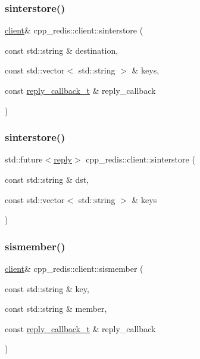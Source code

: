 \subsubsection{\texorpdfstring{sinterstore()}{sinterstore()}\hspace{0.1cm}{\footnotesize\ttfamily [1/2]}}
{\footnotesize\ttfamily \hyperlink{classcpp__redis_1_1client}{client}\& cpp\+\_\+redis\+::client\+::sinterstore (\begin{DoxyParamCaption}\item[{const std\+::string \&}]{destination,  }\item[{const std\+::vector$<$ std\+::string $>$ \&}]{keys,  }\item[{const \hyperlink{classcpp__redis_1_1client_a061a1140d36d2eaeda82b09a0bb3f9f2}{reply\+\_\+callback\+\_\+t} \&}]{reply\+\_\+callback }\end{DoxyParamCaption})}

\mbox{\label{classcpp__redis_1_1client_aa105a26578624af221f16675c0fbfc55}} 
\subsubsection{\texorpdfstring{sinterstore()}{sinterstore()}\hspace{0.1cm}{\footnotesize\ttfamily [2/2]}}
{\footnotesize\ttfamily std\+::future$<$\hyperlink{classcpp__redis_1_1reply}{reply}$>$ cpp\+\_\+redis\+::client\+::sinterstore (\begin{DoxyParamCaption}\item[{const std\+::string \&}]{dst,  }\item[{const std\+::vector$<$ std\+::string $>$ \&}]{keys }\end{DoxyParamCaption})}

\mbox{\label{classcpp__redis_1_1client_a369fb068437dfb3f63091d031174cc19}} 
\subsubsection{\texorpdfstring{sismember()}{sismember()}\hspace{0.1cm}{\footnotesize\ttfamily [1/2]}}
{\footnotesize\ttfamily \hyperlink{classcpp__redis_1_1client}{client}\& cpp\+\_\+redis\+::client\+::sismember (\begin{DoxyParamCaption}\item[{const std\+::string \&}]{key,  }\item[{const std\+::string \&}]{member,  }\item[{const \hyperlink{classcpp__redis_1_1client_a061a1140d36d2eaeda82b09a0bb3f9f2}{reply\+\_\+callback\+\_\+t} \&}]{reply\+\_\+callback }\end{DoxyParamCaption})}

